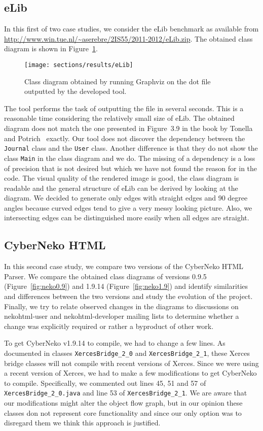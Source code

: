 \subsection{eLib}
In this first of two case studies, we consider the eLib benchmark as available from \url{http://www.win.tue.nl/~aserebre/2IS55/2011-2012/eLib.zip}.
The obtained class diagram is shown in Figure~\ref{fig:eLib}.
\begin{figure}[H]
\center
\texttt{[image: sections/results/eLib]}
\caption{Class diagram obtained by running Graphviz on the dot file outputted by the developed tool.}
\label{fig:eLib}
\end{figure}
The tool performs the task of outputting the file in several seconds. 
This is a reasonable time considering the relatively small size of eLib. 
The obtained diagram does not match the one presented in Figure~3.9 in the book by Tonella and Potrich~\cite{rev-eng} exactly. 
Our tool does not discover the dependency between the \texttt{Journal} class and the \texttt{User} class. 
Another difference is that they do not show the class \texttt{Main} in the class diagram and we do.
The missing of a dependency is a loss of precision that is not desired but which we have not found the reason for in the code.
The visual quality of the rendered image is good, the class diagram is readable and the general structure of eLib can be derived by looking at the diagram. 
We decided to generate only edges with straight edges and 90 degree angles because curved edges tend to give a very messy looking picture.
Also, we intersecting edges can be distinguished more easily when all edges are straight.

\subsection{CyberNeko HTML}
In this second case study, we compare two versions of the CyberNeko HTML Parser. 
We compare the obtained class diagrams of versions 0.9.5 (Figure~\ref{fig:neko0.9}) and 1.9.14 (Figure~\ref{fig:neko1.9}) and identify similarities and differences between the two versions and study the evolution of the project.
Finally, we try to relate observed changes in the diagrams to discussions on nekohtml-user and nekohtml-developer mailing lists to determine whether a change was explicitly required or rather a byproduct of other work.

To get CyberNeko v1.9.14 to compile, we had to change a few lines.
As documented in classes \texttt{XercesBridge\_2\_0} and \texttt{XercesBridge\_2\_1}, these Xerces bridge classes will not compile with recent versions of Xerces.
Since we were using a recent version of Xerces, we had to make a few modifications to get CyberNeko to compile.
Specifically, we commented out lines 45, 51 and 57 of \texttt{XercesBridge\_2\_0.java} and line 53 of \texttt{XercesBridge\_2\_1}.
We are aware that our modifications might alter the object flow graph, but in our opinion these classes don not represent core functionality and since our only option was to disregard them we think this approach is justified.

